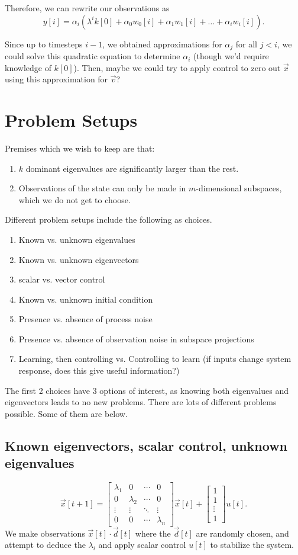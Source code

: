 \documentclass[letterpaper]{article}
\theoremstyle{remark}
\newcommand{\mat}[1]{\ensuremath{\begin{bmatrix}#1\end{bmatrix}}}
\begin{document}
Therefore, we can rewrite our observations as
\[
    y[i] = \alpha_i(\lambda^i k[0] + \alpha_0{w}_0[i] + \alpha_1{w}_1[i] + \ldots + \alpha_i{w}_i[i]).
\]

Since up to timesteps $i - 1$, we obtained approximations for $\alpha_j$ for all $j < i$, we could solve this quadratic equation to determine $\alpha_i$ (though we'd require knowledge of $k[0]$). Then, maybe we could try to apply control to zero out $\vec{x}$ using this approximation for $\vec{v}$?

\section*{Problem Setups}

Premises which we wish to keep are that:
\begin{enumerate}
    \item $k$ dominant eigenvalues are significantly larger than the rest.
    \item Observations of the state can only be made in $m$-dimensional subspaces, which we do not get to choose.
\end{enumerate}

Different problem setups include the following as choices.
\begin{enumerate}
    \item Known vs. unknown eigenvalues
    \item Known vs. unknown eigenvectors
    \item scalar vs. vector control
    \item Known vs. unknown initial condition
    \item Presence vs. absence of process noise
    \item Presence vs. absence of observation noise in subspace projections
    \item Learning, then controlling vs. Controlling to learn (if inputs change system response, does this give useful information?)
\end{enumerate}

The first 2 choices have 3 options of interest, as knowing both eigenvalues and eigenvectors leads to no new problems. There are lots of different problems possible. Some of them are below.


\subsection*{Known eigenvectors, scalar control, unknown eigenvalues}
\[
    \vec{x}[t + 1] = \mat{\lambda_1 & 0 & \cdots & 0 \\ 0 & \lambda_2 & \cdots & 0 \\ \vdots  & \vdots & \ddots & \vdots \\ 0 & 0 & \cdots & \lambda_n} \vec{x}[t] + \mat{1 \\ 1 \\ \vdots \\ 1}u[t].
\]
We make observations $\vec{x}[t] \cdot \vec{d}[t]$ where the $\vec{d}[t]$ are randomly chosen, and attempt to deduce the $\lambda_i$ and apply scalar control $u[t]$ to stabilize the system.
\end{document}
